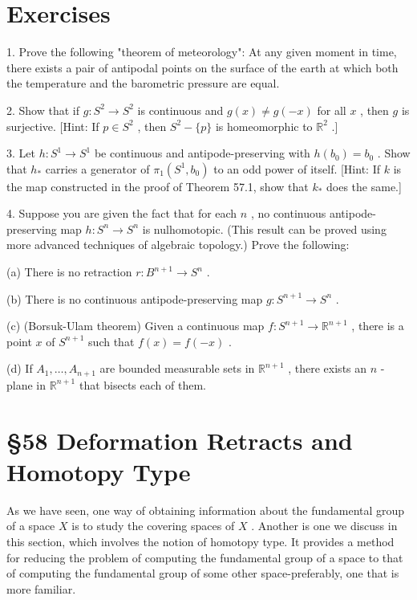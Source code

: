 \documentclass[10pt]{article}
\begin{document}
\section*{Exercises}

1. Prove the following "theorem of meteorology": At any given moment in time, there exists a pair of antipodal points on the surface of the earth at which both the temperature and the barometric pressure are equal.

2. Show that if \(g : {S}^{2} \rightarrow  {S}^{2}\) is continuous and \(g\left( x\right)  \neq  g\left( {-x}\right)\) for all \(x\) , then \(g\) is surjective. [Hint: If \(p \in  {S}^{2}\) , then \({S}^{2} - \{ p\}\) is homeomorphic to \({\mathbb{R}}^{2}\) .]

3. Let \(h : {S}^{1} \rightarrow  {S}^{1}\) be continuous and antipode-preserving with \(h\left( {b}_{0}\right)  = {b}_{0}\) . Show that \({h}_{ * }\) carries a generator of \({\pi }_{1}\left( {{S}^{1},{b}_{0}}\right)\) to an odd power of itself. [Hint: If \(k\) is the map constructed in the proof of Theorem 57.1, show that \({k}_{ * }\) does the same.]

4. Suppose you are given the fact that for each \(n\) , no continuous antipode-preserving map \(h : {S}^{n} \rightarrow  {S}^{n}\) is nulhomotopic. (This result can be proved using more advanced techniques of algebraic topology.) Prove the following:

(a) There is no retraction \(r : {B}^{n + 1} \rightarrow  {S}^{n}\) .

(b) There is no continuous antipode-preserving map \(g : {S}^{n + 1} \rightarrow  {S}^{n}\) .

(c) (Borsuk-Ulam theorem) Given a continuous map \(f : {S}^{n + 1} \rightarrow  {\mathbb{R}}^{n + 1}\) , there is a point \(x\) of \({S}^{n + 1}\) such that \(f\left( x\right)  = f\left( {-x}\right)\) .

(d) If \({A}_{1},\ldots ,{A}_{n + 1}\) are bounded measurable sets in \({\mathbb{R}}^{n + 1}\) , there exists an \(n\) - plane in \({\mathbb{R}}^{n + 1}\) that bisects each of them.

\section*{§58 Deformation Retracts and Homotopy Type}

As we have seen, one way of obtaining information about the fundamental group of a space \(X\) is to study the covering spaces of \(X\) . Another is one we discuss in this section, which involves the notion of homotopy type. It provides a method for reducing the problem of computing the fundamental group of a space to that of computing the fundamental group of some other space-preferably, one that is more familiar.
\end{document}
